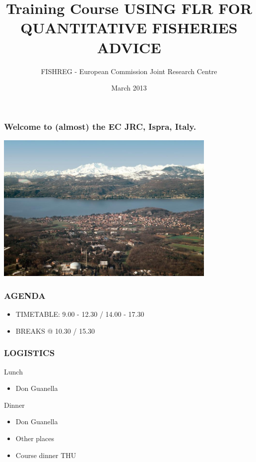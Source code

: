 \documentclass[ignorenonframetext,]{beamer}
\title{Training Course \textbf{USING FLR FOR QUANTITATIVE FISHERIES ADVICE}}
\author{FISHREG - European Commission Joint Research Centre}
\date{March 2013}
\begin{document}
\frame{\titlepage}

\begin{frame}\frametitle{Welcome to (almost) the EC JRC, Ispra, Italy.}

\centering
\includegraphics[keepaspectratio, width=0.8\textwidth]{graphics/jrcispra.png}

\end{frame}

\begin{frame}\frametitle{AGENDA}

\begin{itemize}
\item
  TIMETABLE: 9.00 - 12.30 / 14.00 - 17.30
\item
  BREAKS @ 10.30 / 15.30
\end{itemize}
\end{frame}

\begin{frame}\frametitle{LOGISTICS}

\begin{block}{Lunch}

\begin{itemize}
\item
  Don Guanella
\end{itemize}
\end{block}

\begin{block}{Dinner}

\begin{itemize}
\item
  Don Guanella
\item
  Other places
\item
  Course dinner THU
\end{itemize}
\end{block}

\end{frame}
\end{document}

